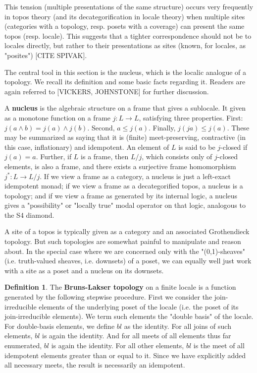 \documentclass[hoptionsi,review,format=acmsmall]{acmart}
\theoremstyle{definition}
\newtheorem{definition}{Definition}[section]
\begin{document}
This tension (multiple presentations of the same structure) occurs very frequently in topos theory (and its decategorification in locale theory) when multiple sites (categories with a topology, resp. posets with a coverage) can present the same topos (resp. locale). This suggests that a tighter correspondence should not be to locales directly, but rather to their presentations as sites (known, for locales, as "posites") [CITE SPIVAK].

The central tool in this section is the nucleus, which is the localic analogue of a topology. We recall its definition and some basic facts regarding it. Readers are again referred to [VICKERS, JOHNSTONE] for further discussion.

A \textbf{nucleus} is the algebraic structure on a frame that gives a sublocale. It given as a monotone function on a frame \(j : L \rightarrow L\), satisfying three properties. First: \(j(a \wedge b) = j(a) \wedge j(b)\). Second, \(a \le j(a)\). Finally, \(j(ja) \le j(a)\). These may be summarized as saying that it is (finite) meet-preserving, contractive (in this case, inflationary) and idempotent. An element of \(L\) is said to be \(j\)-closed if \(j(a)=a\). Further, if \(L\) is a frame, then \(L/j\), which consists only of \(j\)-closed elements, is also a frame, and there exists a surjective frame homomorphism \(j^* : L \rightarrow L/j\). If we view a frame as a category, a nucleus is just a left-exact idempotent monad; if we view a frame as a decategorified topos, a nucleus is a topology; and if we view a frame as generated by its internal logic, a nucleus gives a "possibility" or "locally true" modal operator on that logic, analogous to the S4 diamond.

A site of a topos is typically given as a category and an associated Grothendieck topology. But such topologies are somewhat painful to manipulate and reason about. In the special case where we are concerned only with the "(0,1)-sheaves" (i.e. truth-valued sheaves, i.e. downsets) of a poset, we can equally well just work with a site as a poset and a nucleus on its downsets.

\begin{definition}
The \textbf{Bruns-Lakser topology} on a finite locale is a function generated by the following stepwise procedure. First we consider the join-irreducible elements of the underlying poset of the locale (i.e. the poset of its join-irreducible elements). We term such elements the "double basis" of the locale. For double-basis elements, we define \(bl\) as the identity. For all joins of such elements, \(bl\) is again the identity. And for all meets of all elements thus far enumerated, \(bl\) is again the identity. For all other elements, \(bl\) is the meet of all idempotent elements greater than or equal to it. Since we have explicitly added all necessary meets, the result is necessarily an idempotent.
\end{definition}
\end{document}

